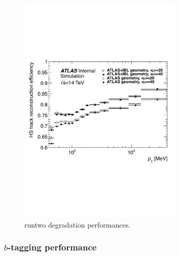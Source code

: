 
\begin{figure}
\centering
\vspace{-4cm}
 \includegraphics[width=0.7\textwidth]{Images/IBL_paper/chapter02_Physics/TrackingEff.pdf}
\vspace{-4cm}
\caption{runtwo  degradation performances.}
\label{fig:runtwoDegradation}

\end{figure}

\subsubsection{$b$-tagging performance}
\label{sec:btagperformance}

